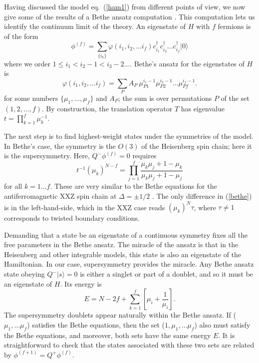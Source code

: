 \documentclass[a4paper,prl,aps,twocolumn]{revtex4}
\begin{document}
Having discussed the model eq.~(\ref{ham1}) from different points of
view, we now give
some of the results of a Bethe ansatz computation \cite{FSii}.
This computation lets us identify the continuum limit of the
theory. An eigenstate of $H$ with $f$ fermions is of the form  
\begin{equation}  
\phi^{(f)} = \sum_{\{i_k\}} \varphi(i_1,i_2,\dots i_f)  
c^\dagger_{i_1}c^\dagger_{i_2}\dots c^\dagger_{i_f}|0\rangle   
\label{Phidef}  
\end{equation}  
where we order $1\le i_1<i_2-1 <i_3-2 \dots$.   
Bethe's ansatz for the eigenstates of $H$ is \cite{Bethe}
\begin{equation}\varphi(i_1,i_2,\dots i_f) = \sum_P  
A_P\  \mu_{P1}^{i_1-1}\mu_{P2}^{i_2-1}\dots \mu_{Pf}^{i_f-1}.  
\label{phidef}  
\end{equation}  
for some numbers $\{\mu_1,\dots,\mu_f\}$ and $A_P$; the sum is over  
permutations $P$ of the set $(1,2,\dots,f)$. By construction, the
translation operator $T$ has eigenvalue $t=\prod_{k=1}^{f}\mu_k^{-1}$.

The next step is to find highest-weight states under the symmetries of 
the model. In  
Bethe's case, the symmetry is the $O(3)$ of the Heisenberg spin  
chain; here it is the supersymmetry. Here, $Q^-\phi^{(f)}=0$ 
requires
\begin{equation}  
t^{-1} (\mu_k)^{N-f}  = \prod_{j=1}^f   
\frac{\mu_k\mu_j +1 - \mu_k}{\mu_k\mu_j +1 -\mu_j}  
\label{bethe}  
\end{equation}  
for all $k=1\dots f$. 
These
are very similar to the Bethe equations for the antiferromagnetic
XXZ spin chain at $\Delta=\pm 1/2$ \cite{Baxter}.  The only
difference in (\ref{bethe}) is in the left-hand-side, which in the XXZ
case reads $(\mu_k)^N \tau$, where $\tau\ne 1$ corresponds to twisted
boundary conditions.

Demanding that a state be an eigenstate of a continuous symmetry
fixes all the free parameters in the Bethe
ansatz. The miracle of the ansatz is that in the Heisenberg 
and other integrable models, this state is also an eigenstate of the
Hamiltonian. In our case, supersymmetry provides the miracle. 
Any Bethe ansatz state obeying $Q^-|s\rangle=0$ is either a singlet
or part of a doublet, and so it must be an eigenstate of $H$. 
Its energy is
\begin{equation}  
E= N-2f + \sum_{k=1}^f \left[\mu_i + \frac{1}{\mu_i}\right].  
\label{energy}  
\end{equation}  
The supersymmetry doublets appear naturally within  
the Bethe ansatz. If ($\mu_1,\dots \mu_f$) satisfies the Bethe  
equations, then the set ($1,\mu_1,\dots\mu_f$) also must satisfy the  
Bethe equations, and moreover, both sets have the same energy $E$.  It  
is straightforward to check that the states associated with these two
sets are related by $\phi^{(f+1)} = Q^+ \phi^{(f)}$.
  
\end{document}
